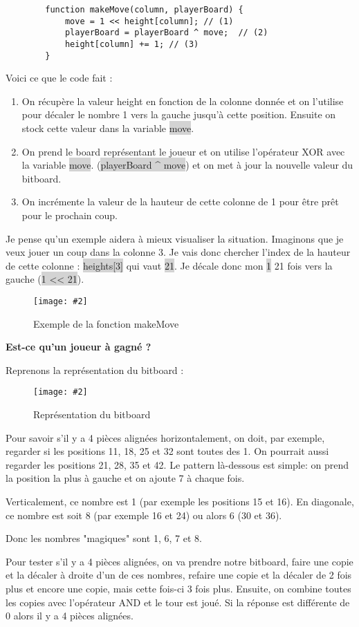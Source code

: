 \documentclass[a4paper]{article}
\newcommand{\img}[3][]{
    \begin{figure}[H]
        \centering
        \texttt{[image: \#2]}
        \caption{#1}    
    \end{figure}
}
\newcommand{\inlinecode}[1]{\colorbox{lightgray}{#1}}
\newcommand{\ptitle}[1]{\vspace{10pt}
{\large \noindent \textbf{#1}}}
\begin{document}
    \begin{lstlisting}
        function makeMove(column, playerBoard) {
            move = 1 << height[column]; // (1)
            playerBoard = playerBoard ^ move;  // (2)
            height[column] += 1; // (3)
        }
    \end{lstlisting}
    Voici ce que le code fait : 
    \begin{enumerate}
        \item On récupère la valeur height en fonction de la colonne donnée et on l'utilise pour décaler le nombre 1 vers la gauche jusqu'à cette position. Ensuite on stock cette valeur dans la variable \inlinecode{move}.
        \item On prend le board représentant le joueur et on utilise l'opérateur XOR avec la variable \inlinecode{move}. (\inlinecode{playerBoard \^{} move}) et on met à jour la nouvelle valeur du bitboard.
        \item On incrémente la valeur de la hauteur de cette colonne de 1 pour être prêt pour le prochain coup.
    \end{enumerate}

    Je pense qu'un exemple aidera à mieux visualiser la situation. Imaginons que je veux jouer un coup dans la colonne 3. Je vais donc chercher l'index de la hauteur de cette colonne : \inlinecode{heights[3]} qui vaut \inlinecode{21}. Je décale donc mon \inlinecode{1} 21 fois vers la gauche (\inlinecode{1 << 21}).

    \img[Exemple de la fonction makeMove]{Images/ExempleMakeMove.png}{1}

    \newpage
    \ptitle{Est-ce qu'un joueur à gagné ?}

    Reprenons la représentation du bitboard :
    \img[Représentation du bitboard]{Images/BitBoard.png}{0.5}
    Pour savoir s'il y a 4 pièces alignées horizontalement, on doit, par exemple, regarder si les positions 11, 18, 25 et 32 sont toutes des 1. On pourrait aussi regarder les positions 21, 28, 35 et 42. Le pattern là-dessous est simple: on prend la position la plus à gauche et on ajoute 7 à chaque fois.

    Verticalement, ce nombre est 1 (par exemple les positions 15 et 16). En diagonale, ce nombre est soit 8 (par exemple 16 et 24) ou alors 6 (30 et 36).

    Donc les nombres "magiques" sont 1, 6, 7 et 8.

    Pour tester s'il y a 4 pièces alignées, on va prendre notre bitboard, faire une copie et la décaler à droite d'un de ces nombres, refaire une copie et la décaler de 2 fois plus et encore une copie, mais cette fois-ci 3 fois plus. Ensuite, on combine toutes les copies avec l'opérateur AND et le tour est joué. Si la réponse est différente de 0 alors il y a 4 pièces alignées.
\end{document}
